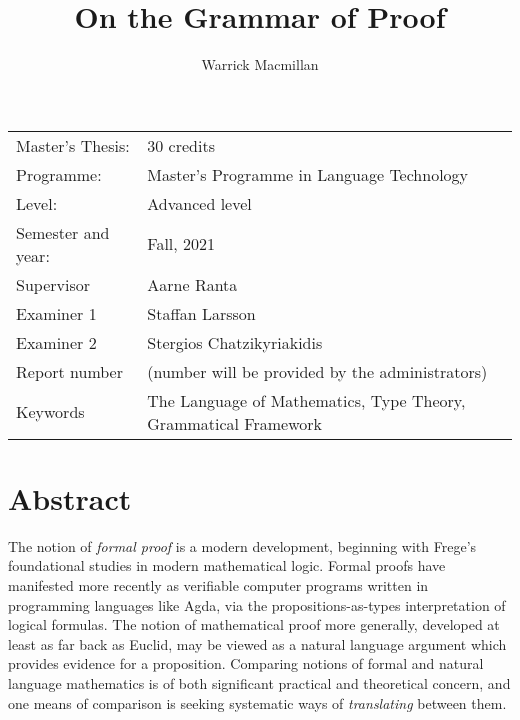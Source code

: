 \documentclass[11pt, a4paper]{article}
\title{On the Grammar of Proof}
\author{Warrick Macmillan}
\begin{document}
\begin{titlepage}

\maketitle

\vfill

\begingroup
\renewcommand*{\arraystretch}{1.2}
\begin{tabular}{l@{\hskip 20mm}l}
\hline
Master's Thesis: & 30 credits\\
Programme: & Master’s Programme in Language Technology\\
Level: & Advanced level \\
Semester and year: & Fall, 2021\\
Supervisor & Aarne Ranta\\
Examiner 1 & Staffan Larsson\\
Examiner 2 & Stergios Chatzikyriakidis \\
Report number & (number will be provided by the administrators) \\
Keywords & The Language of Mathematics, Type Theory, Grammatical Framework
\end{tabular}
\endgroup

\thispagestyle{empty}
\end{titlepage}

\newpage
\singlespacing
\section*{Abstract}


The notion of \emph{formal proof} is a modern development, beginning with
Frege's foundational studies in modern mathematical logic. Formal proofs have
manifested more recently as verifiable computer programs written in programming
languages like Agda, via the propositions-as-types interpretation of logical
formulas. The notion of mathematical proof more generally, developed at least as
far back as Euclid, may be viewed as a natural language argument which provides
evidence for a proposition. Comparing notions of formal and natural language
mathematics is of both significant practical and theoretical concern, and one means
of comparison is seeking systematic ways of \emph{translating} between them.
\end{document}
